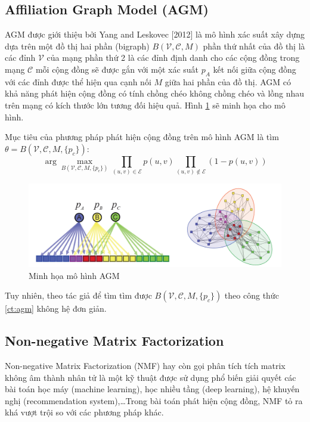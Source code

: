 \subsection{Affiliation Graph Model (AGM)}
AGM được giới thiệu bởi Yang and Leskovec [2012] \cite{yang2012community} là mô hình xác suất xây dựng dựa trên một đồ thị hai phần (bigraph) $B(\mathcal{V},\mathcal{C},M)$ phần thứ nhất của đồ thị là các đỉnh $\mathcal{V}$ của mạng phần thứ 2 là các đỉnh định danh cho các cộng đồng trong mạng $\mathcal{C}$ mỗi cộng đồng sẽ được gắn với một xác suất $p_A$ kết nối giữa cộng đồng với các đỉnh được thể hiện qua cạnh nối $M$ giữa hai phần của đồ thị. AGM có khả năng phát hiện cộng đồng có tính chồng chéo không chồng chéo và lồng nhau trên mạng có kích thước lớn tương đối hiệu quả. Hình \ref{fig:agm} sẽ minh họa cho mô hình.


Mục tiêu của phương pháp phát hiện cộng đồng trên mô hình AGM là tìm  $\theta = B(\mathcal{V},\mathcal{C},M,\{p_c\})$:
\begin{equation}\label{ct:agm}
\arg \max_{B(\mathcal{V},\mathcal{C},M,\{p_c\})}{ \prod_{(u,v)\in \mathcal{E}}{p(u,v)}\prod_{(u,v)\notin \mathcal{E}}{(1-p(u,v))}}
\end{equation}
\begin{figure}[H]
	\centering
	\includegraphics[width=0.8\linewidth]{Chapter1/Chapter1Figs/agm_g}
	\caption{Minh họa mô hình AGM}
	\label{fig:agm}
\end{figure}
Tuy nhiên, theo tác giả để tìm tìm được $B(\mathcal{V},\mathcal{C},M,\{p_c\})$ theo công thức \ref{ct:agm} không hệ đơn giản.

\subsection{Non-negative Matrix Factorization}
Non-negative Matrix Factorization (NMF) hay còn gọi phân tích tích matrix không âm thành nhân tử là một kỹ thuật được sử dụng phổ biến giải quyết các bài toán học máy (machine learning), học nhiều tầng (deep learning), hệ khuyến nghị (recommendation system),\dots Trong bài toán phát hiện cộng đồng, NMF tỏ ra khá vượt trội so với các phương pháp khác.


